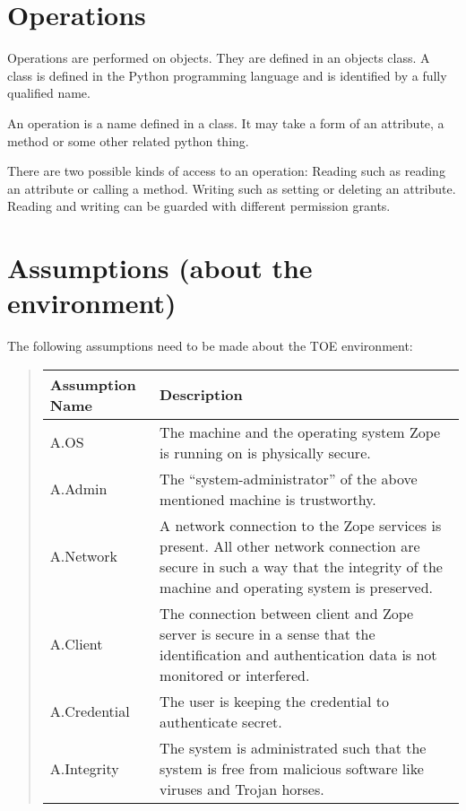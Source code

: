 \documentclass[10pt,a4paper,english]{book}
\newlength{\locallinewidth}
\begin{document}

\hypertarget{operations}{}
\section{Operations}

Operations are performed on objects. They are defined in an objects class. A
class is defined in the Python programming language and is identified by a
fully qualified name.

An operation is a name defined in a class. It may take a form of an attribute, a
method or some other related python thing.

There are two possible kinds of access to an operation: Reading such as
reading an attribute or calling a method. Writing such as setting or deleting
an attribute. Reading and writing can be guarded with different permission grants.



\hypertarget{assumptions-about-the-environment}{}
\section{Assumptions (about the environment)}

The following assumptions need to be made about the TOE environment:
\begin{quote}

\begin{longtable}[c]{|p{0.19\locallinewidth}|p{0.61\locallinewidth}|}
\hline
\textbf{
Assumption Name
} & \textbf{
Description
} \\
\hline
\endhead

A.OS
 & 
The machine and the operating system Zope is
running on is physically secure.
 \\
\hline

A.Admin
 & 
The ``system-administrator'' of the above
mentioned machine is trustworthy.
 \\
\hline

A.Network
 & 
A network connection to the Zope services is
present. All other network connection are
secure in such a way that the integrity of
the machine and operating system is preserved.
 \\
\hline

A.Client
 & 
The connection between client and Zope server is
secure in a sense that the identification and
authentication data is not monitored or interfered.
 \\
\hline

A.Credential
 & 
The user is keeping the credential to authenticate
secret.
 \\
\hline

A.Integrity
 & 
The system is administrated such that the system is
free from malicious software like viruses and
Trojan horses.
 \\
\hline
\end{longtable}
\end{quote}
\end{document}
